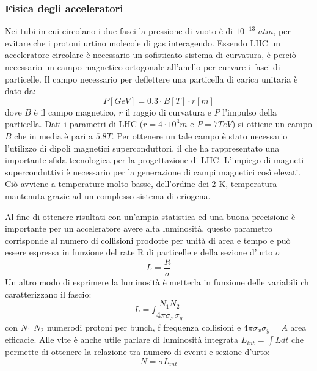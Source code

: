 \subsubsection{Fisica degli acceleratori}

Nei tubi in cui circolano i due fasci la pressione di vuoto è di $10^{-13}$ $atm$, per evitare che i protoni urtino molecole di gas interagendo. 
Essendo LHC un acceleratore circolare è necessario un sofisticato sistema di curvatura, è perciò necessario un campo magnetico ortogonale  all'anello per curvare i fasci di particelle. 
Il campo necessario per deflettere una particella di carica unitaria è dato da:
\begin{equation}
P[GeV]= 0.3 \cdot B[T] \cdot r[m]
\end{equation}
dove $B$ è il campo magnetico, $r$ il raggio di curvatura e $P$ l'impulso della particella. Dati i parametri di LHC ($r= 4 \cdot 10^3 m$ e $P=7 TeV$) si ottiene un campo $B$ che in media è pari a $5.8 T$. Per ottenere un tale campo è stato necessario l'utilizzo di dipoli magnetici superconduttori, il che ha rappresentato una importante sfida tecnologica per la progettazione di LHC. L'impiego di magneti superconduttivi è necessario per la generazione di campi magnetici così elevati. Ciò avviene a temperature molto basse, dell'ordine dei 2 K, temperatura mantenuta grazie ad un complesso sistema di criogena.

Al fine di ottenere risultati con un'ampia statistica ed una buona precisione è importante per un acceleratore avere alta luminosità, questo parametro corrisponde al numero di collisioni prodotte per unità di area e tempo e può essere espressa in funzione del rate R di particelle e della sezione d'urto $\sigma$ 
\begin{equation}
L=\frac{R}{\sigma}
\end{equation}
Un altro modo di esprimere la luminosità è metterla in funzione delle variabili ch caratterizzano il fascio:
\begin{equation}
L = f \frac{N_1 N_2}{4 \pi \sigma_x \sigma_y}
\end{equation}
con $N_1$ $N_2$ numerodi protoni per bunch, f frequenza collisioni e $4\pi \sigma_x \sigma_y =A$ area efficacie. Alle vlte è anche utile parlare di luminosità integrata $L_{int}=\int L dt$ che permette di ottenere la relazione tra numero di eventi e sezione d'urto:
\begin{equation}
N=\sigma L_{int}
\end{equation}

